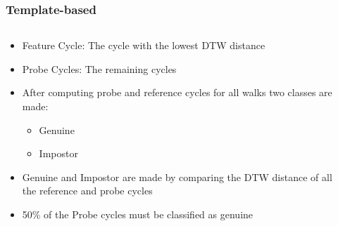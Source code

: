 \documentclass{beamer}
\begin{document}
\begin{frame}
\frametitle{Template-based}
 \begin{columns}
  \begin{column}{.9\textwidth}
  \begin{itemize}
		\item Feature Cycle: The cycle with the lowest DTW distance 
		\linebreak
		\item Probe Cycles: The remaining cycles
		\linebreak
		\item After computing probe and reference cycles for all walks two classes are made:
			\begin{itemize}
			\item Genuine
			\item Impostor
			\linebreak
			\end{itemize}
		
		\item Genuine and Impostor are made by comparing the DTW distance of all the reference and probe cycles					
		\linebreak
		\item 50\% of the Probe cycles must be classified as genuine		
  \end{itemize}
  \end{column}
  \begin{column}{0.7\textwidth}
       \\
  \end{column}
  \end{columns}  
\end{frame}
\end{document}
